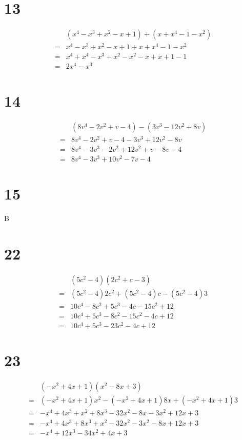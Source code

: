 \documentclass{article}
\theoremstyle{definition}
\begin{document}
\section*{13}
\[
\begin{array}{rl}
	& (x^4-x^3+x^2-x+1)+(x+x^4-1-x^2) \\
=	& x^4-x^3+x^2-x+1+x+x^4-1-x^2 \\
=	& x^4+x^4-x^3+x^2-x^2-x+x+1-1 \\
=	& 2x^4-x^3
\end{array}
\]

\section*{14}
\[
\begin{array}{rl}
	& (8v^4-2v^2+v-4)-(3v^3-12v^2+8v) \\
=	& 8v^4-2v^2+v-4-3v^3+12v^2-8v \\
=	& 8v^4-3v^3-2v^2+12v^2+v-8v-4 \\
=	& 8v^4-3v^3+10v^2-7v-4
\end{array}
\]

\section*{15}
B

\section*{22}
\[
\begin{array}{rl}
	& (5c^2-4)(2c^2+c-3) \\
=	& (5c^2-4)2c^2+(5c^2-4)c-(5c^2-4)3 \\
=	& 10c^4-8c^2+5c^3-4c-15c^2+12 \\
=	& 10c^4+5c^3-8c^2-15c^2-4c+12 \\
=	& 10c^4+5c^3-23c^2-4c+12
\end{array}
\]

\section*{23}
\[
\begin{array}{rl}
	& (-x^2+4x+1)(x^2-8x+3) \\
=	& (-x^2+4x+1)x^2-(-x^2+4x+1)8x+(-x^2+4x+1)3 \\
=	& -x^4+4x^3+x^2+8x^3-32x^2-8x-3x^2+12x+3 \\
=	& -x^4+4x^3+8x^3+x^2-32x^2-3x^2-8x+12x+3 \\
=	& -x^4+12x^3-34x^2+4x+3
\end{array}
\]
\end{document}
